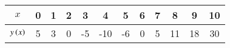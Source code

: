 \begin{center}
\begin{tabular}{|c|c|c|c|c|c|c|c|c|c|c|c|}
\hline
$x$ & 0 & 1 & 2 & 3 & 4 & 5 & 6 & 7 & 8 & 9 & 10 \\
\hline
$y\left(x\right)$ & 5 & 3 & 0 & -5 & -10 & -6 & 0 & 5 & 11 & 18 & 30 \\
\hline
\end{tabular}
\end{center}
